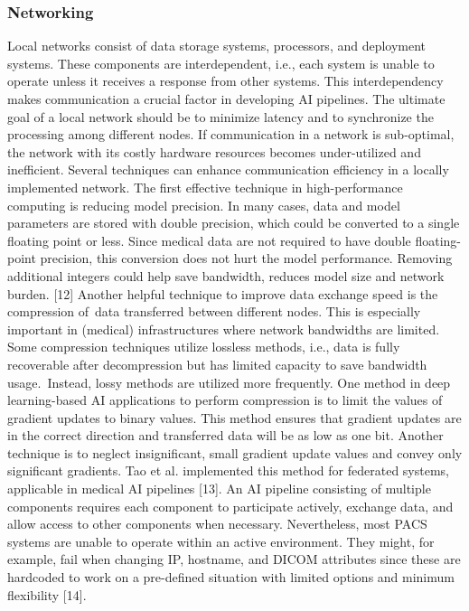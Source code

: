 \subsubsection{Networking}
Local networks consist of data storage systems, processors, and deployment systems. These components are interdependent, i.e., each system is unable to operate unless it receives a response from other systems. This interdependency makes communication a crucial factor in developing AI pipelines. The ultimate goal of a local network should be to minimize latency and to synchronize the processing among different nodes. If communication in a network is sub-optimal, the network with its costly hardware resources becomes under-utilized and inefficient. 
Several techniques can enhance communication efficiency in a locally implemented network. The first effective technique in high-performance computing is reducing model precision. In many cases, data and model parameters are stored with double precision, which could be converted to a single floating point or less. Since medical data are not required to have double floating-point precision, this conversion does not hurt the model performance. Removing additional integers could help save bandwidth, reduces model size and network burden. [12] 
Another helpful technique to improve data exchange speed is the compression of data transferred between different nodes. This is especially important in (medical) infrastructures where network bandwidths are limited. Some compression techniques utilize lossless methods, i.e., data is fully recoverable after decompression but has limited capacity to save bandwidth usage. Instead, lossy methods are utilized more frequently. One method in deep learning-based AI applications to perform compression is to limit the values of gradient updates to binary values. This method ensures that gradient updates are in the correct direction and transferred data will be as low as one bit. Another technique is to neglect insignificant, small gradient update values and convey only significant gradients. Tao et al. implemented this method for federated systems, applicable in medical AI pipelines [13]. 
An AI pipeline consisting of multiple components requires each component to participate actively, exchange data, and allow access to other components when necessary. Nevertheless, most PACS systems are unable to operate within an active environment. They might, for example, fail when changing IP, hostname, and DICOM attributes since these are hardcoded to work on a pre-defined situation with limited options and minimum flexibility [14].
